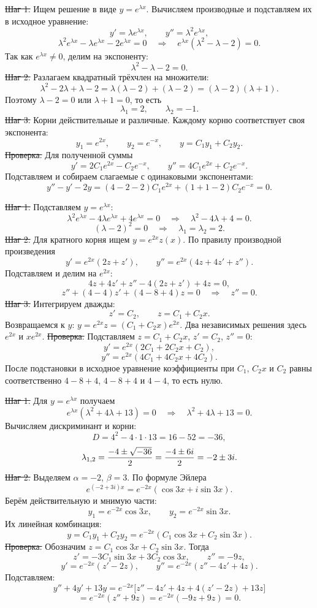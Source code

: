 \st{Шаг 1.} Ищем решение в виде $y=e^{\lambda x}$. Вычисляем производные
и подставляем их в исходное уравнение:
$$y'=\lambda e^{\lambda x},\qquad y''=\lambda^2e^{\lambda x},$$
$$\lambda^2e^{\lambda x}-\lambda e^{\lambda x}-2e^{\lambda x}=0
\quad\Rightarrow\quad e^{\lambda x}(\lambda^2-\lambda-2)=0.$$
Так как $e^{\lambda x}\ne0$, делим на экспоненту:
$$\lambda^2-\lambda-2=0.$$
\st{Шаг 2.} Разлагаем квадратный трёхчлен на множители:
$$\lambda^2-2\lambda+\lambda-2
=\lambda(\lambda-2)+(\lambda-2)=(\lambda-2)(\lambda+1).$$
Поэтому $\lambda-2=0$ или $\lambda+1=0$, то есть
$$\lambda_1=2,\qquad\lambda_2=-1.$$
\st{Шаг 3.} Корни действительные и различные. Каждому корню соответствует
своя экспонента:
$$y_1=e^{2x},\qquad y_2=e^{-x},\qquad y=C_1y_1+C_2y_2.$$
\st{Проверка.} Для полученной суммы
$$y'=2C_1e^{2x}-C_2e^{-x},\qquad y''=4C_1e^{2x}+C_2e^{-x}.$$
Подставляем и собираем слагаемые с одинаковыми экспонентами:
$$y''-y'-2y=(4-2-2)C_1e^{2x}+(1+1-2)C_2e^{-x}=0.$$

\vfil\eject
{}
\st{Шаг 1.} Подставляем $y=e^{\lambda x}$:
$$\lambda^2e^{\lambda x}-4\lambda e^{\lambda x}+4e^{\lambda x}=0
\quad\Rightarrow\quad\lambda^2-4\lambda+4=0.$$
$$ (\lambda-2)^2=0\quad\Rightarrow\quad\lambda_1=\lambda_2=2.$$
\st{Шаг 2.} Для кратного корня ищем $y=e^{2x}z(x)$. По правилу
производной произведения
$$y'=e^{2x}(2z+z'),\qquad y''=e^{2x}(4z+4z'+z'').$$
Подставляем и делим на $e^{2x}$:
$$4z+4z'+z''-4(2z+z')+4z=0,$$
$$z''+(4-4)z'+(4-8+4)z=0\quad\Rightarrow\quad z''=0.$$
\st{Шаг 3.} Интегрируем дважды:
$$z'=C_2,\qquad z=C_1+C_2x.$$
Возвращаемся к $y$: $y=e^{2x}z=(C_1+C_2x)e^{2x}$.
Два независимых решения здесь $e^{2x}$ и $xe^{2x}$.
\st{Проверка.} Подставляем $z=C_1+C_2x$, $z'=C_2$, $z''=0$:
$$y'=e^{2x}(2C_1+2C_2x+C_2),$$
$$y''=e^{2x}(4C_1+4C_2x+4C_2).$$
После подстановки в исходное уравнение коэффициенты при $C_1$, $C_2x$
и $C_2$ равны соответственно $4-8+4$, $4-8+4$ и $4-4$, то есть нулю.

\vfil\eject
{}
\st{Шаг 1.} Для $y=e^{\lambda x}$ получаем
$$e^{\lambda x}(\lambda^2+4\lambda+13)=0
\quad\Rightarrow\quad\lambda^2+4\lambda+13=0.$$
Вычисляем дискриминант и корни:
$$D=4^2-4\cdot1\cdot13=16-52=-36,$$
$$\lambda_{1,2}={-4\pm\sqrt{-36}\over2}
={-4\pm6i\over2}=-2\pm3i.$$
\st{Шаг 2.} Выделяем $\alpha=-2$, $\beta=3$. По формуле Эйлера
$$e^{(-2+3i)x}=e^{-2x}(\cos3x+i\sin3x).$$
Берём действительную и мнимую части:
$$y_1=e^{-2x}\cos3x,\qquad y_2=e^{-2x}\sin3x.$$
Их линейная комбинация:
$$y=C_1y_1+C_2y_2=e^{-2x}(C_1\cos3x+C_2\sin3x).$$
\st{Проверка.} Обозначим $z=C_1\cos3x+C_2\sin3x$. Тогда
$$z'=-3C_1\sin3x+3C_2\cos3x,\qquad z''=-9z,$$
$$y'=e^{-2x}(z'-2z),\qquad y''=e^{-2x}(z''-4z'+4z).$$
Подставляем:
$$y''+4y'+13y=e^{-2x}\bigl[z''-4z'+4z+4(z'-2z)+13z\bigr]$$
$$=e^{-2x}(z''+9z)=e^{-2x}(-9z+9z)=0.$$

